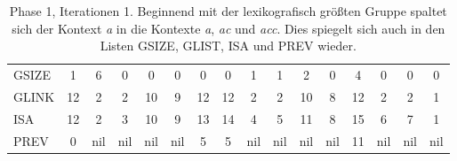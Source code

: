 \begin{table}[H]
\begin{adjustbox}{max width=\textwidth}
\begin{tabular}{lccccccccccccccc}
\multicolumn{1}{l|}{GSIZE}   & \multicolumn{1}{c|}{1}    & \cellcolor[HTML]{\red}6 & 0   & 0   & 0                         & 0                         & \multicolumn{1}{c|}{0}    & \multicolumn{1}{c|}{\cellcolor[HTML]{\red}1}  & \multicolumn{1}{c|}{\cellcolor[HTML]{\red}1}   & 2   & \multicolumn{1}{c|}{0}    & 4                          & 0                          & 0                          & 0                          \\
\multicolumn{1}{l|}{GLINK}   & 12                        & 2                         & 2   & 10  & \cellcolor[HTML]{\red}9 & 12                        & 12                        & 2                                               & 2                                                & 10  & \cellcolor[HTML]{\red}8 & 12                         & 2                          & 2                          & 1                          \\
\multicolumn{1}{l|}{ISA}     & 12                        & 2                         & 3   & 10  & \cellcolor[HTML]{\red}9 & 13                        & 14                        & \cellcolor[HTML]{\red}4                       & \cellcolor[HTML]{\red}5                        & 11  & \cellcolor[HTML]{\red}8 & 15                         & \cellcolor[HTML]{\red}6  & \cellcolor[HTML]{\red}7  & 1                          \\
\multicolumn{1}{l|}{PREV}    & \cellcolor[HTML]{\red}0 & nil                       & nil & nil & nil                       & \cellcolor[HTML]{\red}5 & \cellcolor[HTML]{\red}5 & nil                                             & nil                                              & nil & nil                       & \cellcolor[HTML]{\red}11 & nil                        & nil                        & nil                       
\end{tabular}
\end{adjustbox}

\caption[Phase 1, Iterationen 1]{Phase 1, Iterationen 1. Beginnend mit der lexikografisch größten Gruppe spaltet sich der Kontext \textit{a} in die Kontexte \textit{a}, \textit{ac} und \textit{acc}. Dies spiegelt sich auch in den Listen GSIZE, GLIST, ISA und PREV wieder.}
\label{table_complex_example_1_1} 
\end{table}

